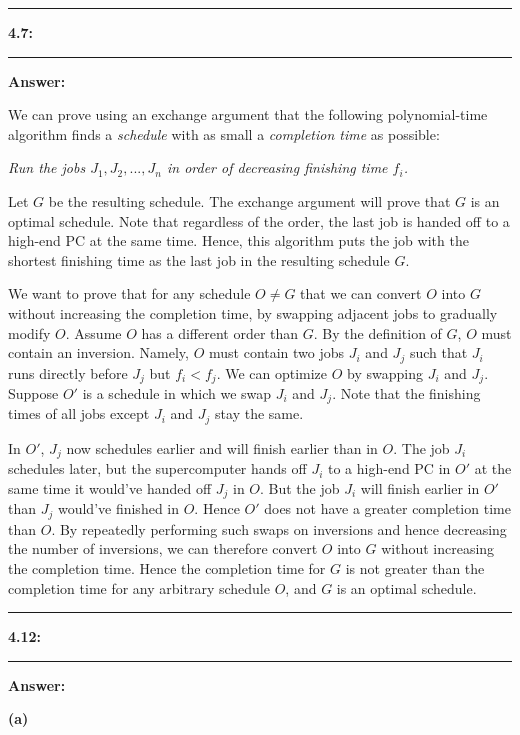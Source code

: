 \documentclass[11pt]{article}
\newcommand\question[2]{\vspace{.25in}\hrule\textbf{#1: #2}\vspace{.5em}\hrule\vspace{.10in}}
\renewcommand\part[1]{\vspace{.10in}\textbf{(#1)}}
\newcommand\answer{\vspace{.10in}\textbf{Answer: }}
\begin{document}
\question{4.7}{}

\answer

We can prove using an exchange argument that the following polynomial-time algorithm finds a \textit{schedule} with as small a \textit{completion time} as possible:\newline

\textit{Run the jobs $J_1, J_2, ..., J_n$ in order of decreasing finishing time $f_i$.}\newline

Let $G$ be the resulting schedule. The exchange argument will prove that $G$ is an optimal schedule. Note that regardless of the order, the last job is handed off to a high-end PC at the same time. Hence, this algorithm puts the job with the shortest finishing time as the last job in the resulting schedule $G$.\newline

We want to prove that for any schedule $O \neq G$ that we can convert $O$ into $G$ without increasing the completion time, by swapping adjacent jobs to gradually modify $O$. Assume $O$ has a different order than $G$. By the definition of $G$, $O$ must contain an inversion. Namely, $O$ must contain two jobs $J_i$ and $J_j$ such that $J_i$ runs directly before $J_j$ but $f_i < f_j$. We can optimize $O$ by swapping $J_i$ and $J_j$. Suppose $O'$ is a schedule in which we swap $J_i$ and $J_j$. Note that the finishing times of all jobs except $J_i$ and $J_j$ stay the same.\newline

In $O'$, $J_j$ now schedules earlier and will finish earlier than in $O$. The job $J_i$ schedules later, but the supercomputer hands off $J_i$ to a high-end PC in $O'$ at the same time it would've handed off $J_j$ in $O$. But the job $J_i$ will finish earlier in $O'$ than $J_j$ would've finished in $O$. Hence $O'$ does not have a greater completion time than $O$. By repeatedly performing such swaps on inversions and hence decreasing the number of inversions, we can therefore convert $O$ into $G$ without increasing the completion time. Hence the completion time for $G$ is not greater than the completion time for any arbitrary schedule $O$, and $G$ is an optimal schedule.

\clearpage

\question{4.12}{}

\answer

\part{a}
\end{document}

